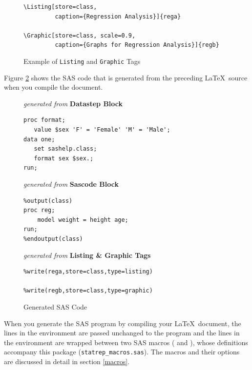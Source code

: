 \documentclass[article,oneside]{memoir}
\begin{document}
\begin{figure}[H]
\begin{snugshade}
\begin{verbatim}
\Listing[store=class,
         caption={Regression Analysis}]{rega}

\Graphic[store=class, scale=0.9,
         caption={Graphs for Regression Analysis}]{regb}
\end{verbatim}
\end{snugshade}
\caption{Example of \texttt{Listing} and \texttt{Graphic} Tags}\label{fig:slg}
\end{figure}

  Figure \ref{fig:sgp} shows the SAS code that is generated
  from the preceding \LaTeX\ source when you compile the document.

\begin{figure}[H]
\begin{framed}
\begin{snugshade}
{\hfil\emph{generated from }\textbf{Datastep Block}\hfil}
\begin{verbatim}
proc format;
   value $sex 'F' = 'Female' 'M' = 'Male';
data one;
   set sashelp.class;
   format sex $sex.;
run;
\end{verbatim}
\end{snugshade}
\begin{snugshade}
{\hfil\emph{generated from }\textbf{Sascode Block}\hfil}
\begin{verbatim}
%output(class)
proc reg;
    model weight = height age;
run;
%endoutput(class)
\end{verbatim}
\end{snugshade}
\begin{snugshade}
{\hfil\emph{generated from }\textbf{Listing \& Graphic Tags}\hfil}
\begin{verbatim}
%write(rega,store=class,type=listing)

%write(regb,store=class,type=graphic)
\end{verbatim}
\end{snugshade}
\end{framed}
\caption{Generated SAS Code}\label{fig:sgp}
\end{figure}

  When you generate the SAS program by compiling your \LaTeX\ document,
  the lines in the  environment are passed unchanged to the program
  and
  the lines in the 
  environment are wrapped between two SAS macros ( and ),
  whose definitions accompany this package (\texttt{statrep\_macros.sas}).
  The macros and their options are discussed in detail in section \ref{macros}.
\end{document}

